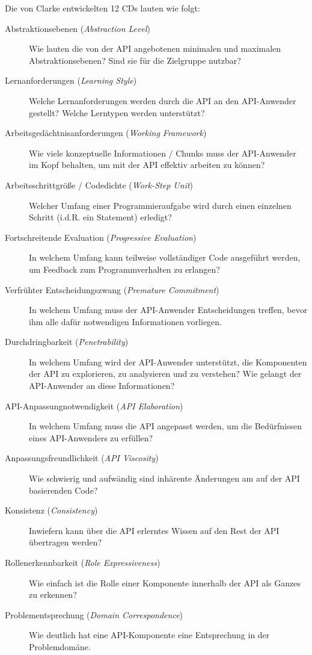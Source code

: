 \begin{important}
Die von Clarke entwickelten 12 CDs lauten wie folgt:
\begin{description}
\item[Abstraktionsebenen (\textit{Abstraction Level})] Wie lauten die von der API angebotenen minimalen und maximalen Abstraktionsebenen? Sind sie für die Zielgruppe nutzbar?
\item[Lernanforderungen (\textit{Learning Style})] Welche Lernanforderungen werden durch die API an den API-Anwender gestellt? Welche Lerntypen werden unterstützt?
\item[Arbeitsgedächtnisanforderungen (\textit{Working Framework})] Wie viele konzeptuelle Informationen / Chunks muss der API-Anwender im Kopf behalten, um mit der API effektiv arbeiten zu können?
\item[Arbeitsschrittgröße / Codedichte (\textit{Work-Step Unit})] Welcher Umfang einer Programmieraufgabe wird durch einen einzelnen Schritt (i.d.R. ein Statement) erledigt?
\item[Fortschreitende Evaluation (\textit{Progressive Evaluation})] In welchem Umfang kann teilweise vollständiger Code ausgeführt werden, um Feedback zum Programmverhalten zu erlangen?
\item[Verfrühter Entscheidungszwang (\textit{Premature Commitment})] In welchem Umfang muss der API-Anwender Entscheidungen treffen, bevor ihm alle dafür notwendigen Informationen vorliegen.
\item[Durchdringbarkeit (\textit{Penetrability})] In welchem Umfang wird der API-Anwender unterstützt, die Komponenten der API zu explorieren, zu analysieren und zu verstehen? Wie gelangt der API-Anwender an diese Informationen?
\item[API-Anpassungnotwendigkeit (\textit{API Elaboration})] In welchem Umfang muss die API angepasst werden, um die Bedürfnissen eines API-Anwenders zu erfüllen?
\item[Anpassungsfreundlichkeit (\textit{API Viscosity})] Wie schwierig und aufwändig sind inhärente Änderungen am auf der API basierenden Code?
\item[Konsistenz (\textit{Consistency})] Inwiefern kann über die API erlerntes Wissen auf den Rest der API übertragen werden?
\item[Rollenerkennbarkeit (\textit{Role Expressiveness})] Wie einfach ist die Rolle einer Komponente innerhalb der API als Ganzes zu erkennen?
\item[Problementsprechung (\textit{Domain Correspondence})] Wie deutlich hat eine API-Komponente eine Entsprechung in der Problemdomäne.
\end{description}


\end{important}

